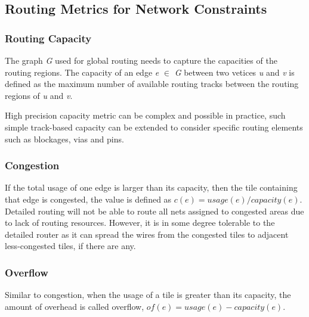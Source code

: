 \subsection{Routing Metrics for Network Constraints}
\subsubsection{Routing Capacity}
The graph \emph{G} used for global routing needs to capture the capacities of the routing regions. The capacity of an edge \emph{e} $\in$ \emph{G} between two vetices \emph{u} and \emph{v} is defined as the maximum number of available routing tracks between the routing regions of \emph{u} and \emph{v}. 

High precision capacity metric can be complex and possible in practice, such simple track-based capacity can be extended  to consider specific routing elements such as blockages, vias and pins.
\subsubsection{Congestion}
If the total usage of one edge is larger than its capacity, then the tile containing that edge is congested, the value is defined as $c(e)=usage(e)/capacity(e)$. Detailed routing will not be able to route all nets assigned to congested areas due to lack of routing resources. However, it is in some degree tolerable to the detailed router as it can spread the wires from the congested tiles to adjacent less-congested tiles, if there are any.
\subsubsection{Overflow}
Similar to congestion, when the usage of a tile is greater than its capacity, the amount of overhead is called overflow, $of(e)=usage(e)-capacity(e)$.

